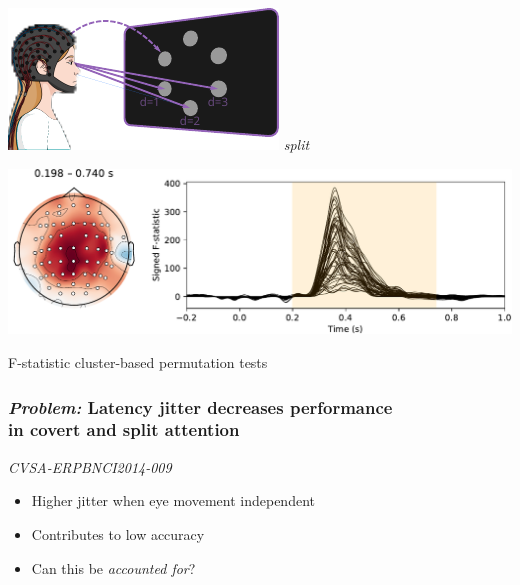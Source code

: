 \documentclass{kul-ulille-beamer}
\begin{document}
\begin{frame}
\begin{minipage}[t]{.45\textwidth}
    \includegraphics[width=.2\textwidth]{figures/covert/attention_split.pdf}
    \hspace{.5em}
    \emph{split}
    \smallskip

    \includegraphics[width=\textwidth]{figures/covert/erps/erp_split_cluster-0.pdf}

  \end{minipage}
  \centering
  \smallskip

  {\tiny F-statistic cluster-based permutation tests}
\end{frame}




\begin{frame}[c]
  \frametitle{\emph{Problem:} Latency jitter decreases performance \\ in covert and split
  attention}
  \begin{minipage}{.4\textwidth}
    
  \end{minipage}\hfill%
  \begin{minipage}{.55\textwidth}

    \small
    \hspace{3.25em}\emph{CVSA-ERP}\hspace{6.45em}\emph{BNCI2014-009}
    \smallskip

    \centering
    {\centering\resizebox{.7\textwidth}{!}{%
    
    }}

    \begin{itemize}
      \item Higher jitter when eye movement independent
      \item Contributes to low accuracy \\ {\tiny\cite{Arico2014}}
      \item Can this be \emph{accounted for}?
    \end{itemize}

  \end{minipage}

\end{frame}
\end{document}
